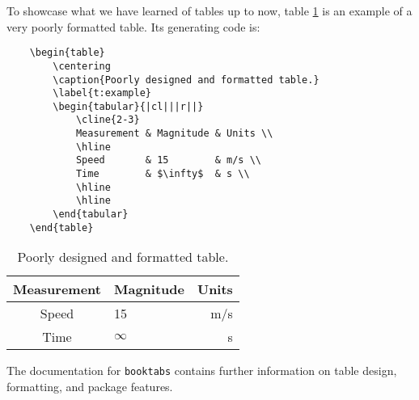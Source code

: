 To showcase what we have learned of tables up to now, table \ref{t:example} is an example of a very poorly formatted table. Its generating code is:
\begin{verbatim}
	\begin{table}
	    \centering
	    \caption{Poorly designed and formatted table.}
	    \label{t:example}
	    \begin{tabular}{|cl|||r||}
	        \cline{2-3}
	        Measurement & Magnitude & Units \\
	        \hline
	        Speed		& 15		& m/s \\
	        Time		& $\infty$	& s \\
	        \hline
	        \hline
	    \end{tabular}
	\end{table}
\end{verbatim}
\begin{table}[!htbp]
    \centering
    \caption{Poorly designed and formatted table.}
    \label{t:example}
    \begin{tabular}{|cl|||r||}
        \cline{2-3}
        Measurement & Magnitude & Units \\
        \hline
        Speed		& 15		& m/s \\
        Time		& $\infty$	& s \\
        \hline
        \hline
    \end{tabular}
\end{table}

The documentation for \verb|booktabs| contains further information on table design, formatting, and package features.
%
